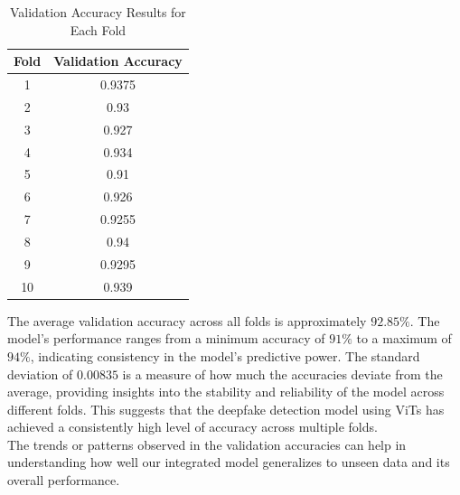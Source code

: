 \begin{table}[ht]
    \centering
    \renewcommand{\arraystretch}{1.5}
    \begin{tabular}{|c|c|}
        \hline
        \textbf{Fold} & \textbf{Validation Accuracy} \\
        \hline
        1             & 0.9375                       \\
        \hline
        2             & 0.93                         \\
        \hline
        3             & 0.927                        \\
        \hline
        4             & 0.934                        \\
        \hline
        5             & 0.91                         \\
        \hline
        6             & 0.926                        \\
        \hline
        7             & 0.9255                       \\
        \hline
        8             & 0.94                         \\
        \hline
        9             & 0.9295                       \\
        \hline
        10            & 0.939                        \\
        \hline
    \end{tabular}
    \caption{Validation Accuracy Results for Each Fold}
    \label{tab:kfold_results}
\end{table}

The average validation accuracy across all folds is approximately \(92.85\%\). The model's performance ranges from a minimum accuracy of \(91\%\) to a maximum of \(94\%\), indicating consistency in the model's predictive power. The standard deviation of \(0.00835\) is a measure of how much the accuracies deviate from the average, providing insights into the stability and reliability of the model across different folds. This suggests that the deepfake detection model using ViTs has achieved a consistently high level of accuracy across multiple folds.\\

The trends or patterns observed in the validation accuracies can help in understanding how well our integrated model generalizes to unseen data and its overall performance.


\newpage
